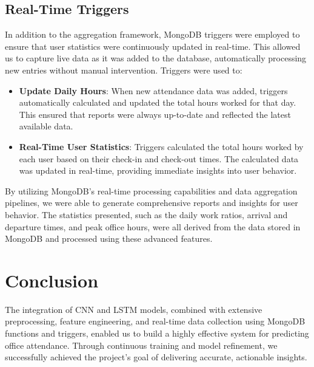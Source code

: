 \documentclass[11pt,a4paper]{article}
\begin{document}
\subsection*{Real-Time Triggers}
In addition to the aggregation framework, MongoDB triggers were employed to ensure that user statistics were continuously updated in real-time. 
This allowed us to capture live data as it was added to the database, automatically processing new entries without manual intervention. Triggers were used to:
\begin{itemize}
    \item \textbf{Update Daily Hours}: When new attendance data was added, triggers automatically calculated and updated the total hours worked for that day. 
    This ensured that reports were always up-to-date and reflected the latest available data.
    
    \item \textbf{Real-Time User Statistics}: Triggers calculated the total hours worked by each user based on their check-in and check-out times. 
    The calculated data was updated in real-time, providing immediate insights into user behavior.
\end{itemize}

By utilizing MongoDB's real-time processing capabilities and data aggregation pipelines, we were able to generate comprehensive reports and insights for user behavior. 
The statistics presented, such as the daily work ratios, arrival and departure times, and peak office hours, 
were all derived from the data stored in MongoDB and processed using these advanced features.

\pagebreak

\section*{Conclusion}
The integration of CNN and LSTM models, combined with extensive preprocessing, feature engineering, 
and real-time data collection using MongoDB functions and triggers, enabled us to build a highly effective system for predicting office attendance. 
Through continuous training and model refinement, we successfully achieved the project’s goal of delivering accurate, actionable insights.
\end{document}
